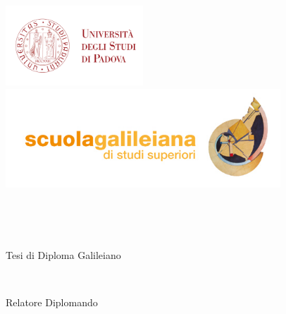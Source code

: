 \begin{titlepage}
	\begin{addmargin}[-1cm]{-3cm}
    \begin{center}
        \large

        \includegraphics[height=3cm]{gfx/logo_unipd_named.png}
				\hfill
				\includegraphics[height=3.7cm]{gfx/logo_gali.jpg}

        \vspace{1.5cm}

        \begingroup
            \color{Maroon}\spacedallcaps{\myUni} \\ \medskip
						\color{Maroon}\spacedlowsmallcaps{\myFaculty}
        \endgroup

				\vspace{1cm}

				\spacedlowsmallcaps{\myDepartment} \\ \medskip

        \vspace{1cm}

				\small {Tesi di Diploma Galileiano} \\ \medskip

				\vspace{2cm}

				\begingroup
						\huge \color{Maroon}\spacedallcaps{\myTitle} \\ \bigskip
				\endgroup

				\vfill

				Relatore \hfill Diplomando \\ \medskip
				\myProf \hfill \myName


\end{center}
\end{addmargin}
\end{titlepage}
